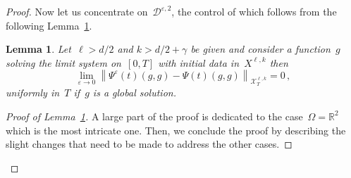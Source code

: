 \documentclass[11pt]{article}
\newtheorem{lemm}[theo]{Lemma}
\theoremstyle{definition}
\numberwithin{equation}{section}
\numberwithin{figure}{section}
\numberwithin{table}{section}
\newcommand*\R {\mathbb{R}}
\newcommand*\eps{{\varepsilon}}
\newcommand*\e{{\varepsilon}}
\begin{document}
\begin{proof}
Now let us concentrate on~$ {\mathcal D} ^{\eps,2}$, the control of which follows from the following Lemma~\ref{estimatePsiepslimitPsi0Xellk}.

\begin{lemm}\label{estimatePsiepslimitPsi0Xellk}
Let~$\ell>d/2$ and ${k>d/2+\gamma}$ be given and consider a function~$g$ solving the limit system on~$[0,T]$ with initial data in~$X^{\ell,k}$ then
\[
\lim_{\e \to 0}\left\| \Psi^\eps(t) (g,g)- \Psi(t) (g,g)\right\|_{{\mathcal X}_T^{\ell,k}} = 0\,,
\]
uniformly in~$T$ if~$g$ is a global solution.
\end{lemm}


\begin{proof}[{Proof of Lemma~\ref{estimatePsiepslimitPsi0Xellk}}]
A large part of the proof is dedicated to the case~$\Omega = \R^2$ which is the most intricate one. Then, we conclude the proof by describing the slight changes that need to be made to address the other cases.


\end{proof}
\end{proof}
\end{document}
